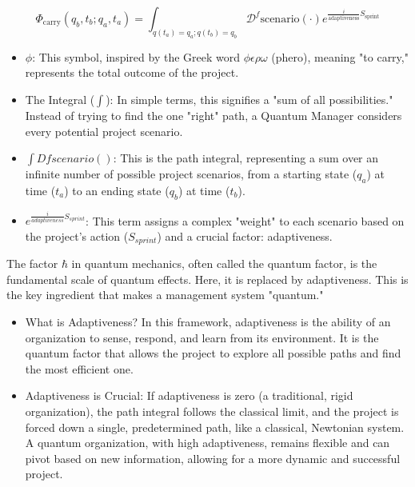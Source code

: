 \documentclass{article}
\begin{document}
\begin{equation}
\Phi_{\text{carry}}(q_b, t_b; q_a, t_a) = \int_{q(t_a)=q_a; q(t_b)=q_b} \mathcal{D}^f \text{scenario}(\cdot) e^{\frac{i}{\text{adaptiveness}} S_{\text{sprint}}}
\end{equation}
\begin{itemize}
\item $\phi$: This symbol, inspired by the Greek word $\phi \epsilon \rho \omega$ (phero), meaning "to carry," represents the total outcome of the project.
\item The Integral ($\int$): In simple terms, this signifies a "sum of all possibilities." Instead of trying to find the one "right" path, a Quantum Manager considers every potential project scenario.
\item $\int Dfscenario()$: This is the path integral, representing a sum over an infinite number of possible project scenarios, from a starting state ($q_a$) at time ($t_a$) to an ending state ($q_b$) at time ($t_b$).
\item $e^{\frac{i}{adaptiveness}S_{sprint}}$: This term assigns a complex "weight" to each scenario based on the project's action ($S_{sprint}$) and a crucial factor: adaptiveness.
\end{itemize}
The factor $\hbar$ in quantum mechanics, often called the quantum factor, is the fundamental scale of quantum effects. Here, it is replaced by adaptiveness. This is the key ingredient that makes a management system "quantum."

\begin{itemize}
\item What is Adaptiveness? In this framework, adaptiveness is the ability of an organization to sense, respond, and learn from its environment. It is the quantum factor that allows the project to explore all possible paths and find the most efficient one.
\item Adaptiveness is Crucial: If adaptiveness is zero (a traditional, rigid organization), the path integral follows the classical limit, and the project is forced down a single, predetermined path, like a classical, Newtonian system. A quantum organization, with high adaptiveness, remains flexible and can pivot based on new information, allowing for a more dynamic and successful project.
\end{itemize}
\end{document}
